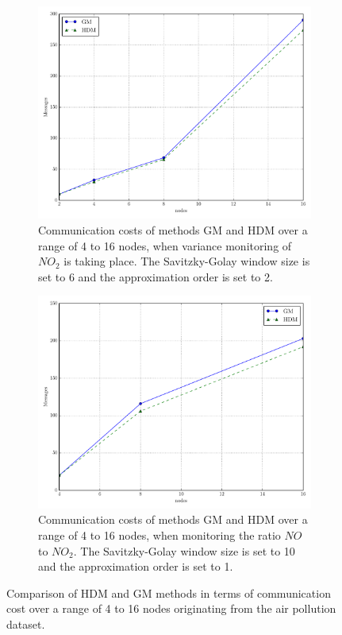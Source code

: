 \begin{figure}[!h]
\begin{subfigure}{0.49\textwidth}
  \includegraphics[width=\linewidth]{img/actual_msg_NO2_sq_2014_nodes_wl_6_order_2.pdf}
  \caption{Communication costs of methods GM and HDM over a range of 4 to 16 nodes, when variance monitoring of $NO_2$ is taking place. The Savitzky-Golay window size is set to 6 and the approximation order is set to 2.}
\end{subfigure}\hfill
\begin{subfigure}{0.49\textwidth}
  \includegraphics[width=\linewidth]{img/actual_msg_NO2_NO_2014_nodes.pdf}
  \caption{Communication costs of methods GM and HDM over a range of 4 to 16 nodes, when monitoring the ratio $NO$ to $NO_2$. The Savitzky-Golay window size is set to 10 and the approximation order is set to 1.}
  \vspace{1.2em}
\end{subfigure}\hfill
\vspace{0.5cm}
\caption{Comparison of HDM and GM methods in terms of communication cost over a range of 4 to 16 nodes originating from the air pollution dataset.} \label{fig:actualComp}
\end{figure}

